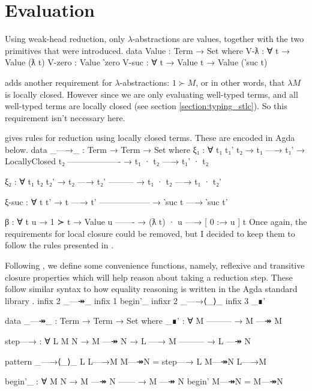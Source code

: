\documentclass[logo,bsc,singlespacing,parskip,online]{infthesis}
\renewenvironment{code}{\mintedcopy[breaklines,breaksymbolleft=\;]{agda}}{\endmintedcopy}
\begin{document}
\section{Evaluation}
Using weak-head reduction, only $\lambda$-abstractions are values, together with the two primitives
that were introduced.
\begin{code}
data Value : Term → Set where
  V-ƛ : ∀ {t} → Value (ƛ t)
  V-zero : Value ‵zero
  V-suc : ∀ {t} → Value t → Value (‵suc t)
\end{code}

\citet{chargueraud_locally_2012} adds another requirement for $\lambda$-abstractions: $1 \succ M$,
or in other words, that $\lambda M$ is locally closed. However since we are only evaluating
well-typed terms, and all well-typed terms are locally closed (see section
\ref{section:typing_stlc}). So this requirement isn't necessary here.

\citet{chargueraud_locally_2012} gives rules for reduction using locally closed terms. These are
encoded in Agda below.
\begin{code}
data _—→_ : Term → Term → Set where
  ξ₁ : ∀ {t₁ t₁' t₂}
    → t₁ —→ t₁'
    → LocallyClosed t₂
      -------------------
    → t₁ · t₂ —→ t₁' · t₂

  ξ₂ : ∀ {t₁ t₂ t₂'}
    → t₂ —→ t₂'
      ---------
    → t₁ · t₂ —→ t₁ · t₂'

  ξ-suc : ∀ {t t'}
    → t —→ t'
      ------------------
    → ‵suc t —→ ‵suc t'

  β : ∀ {t u}
    → 1 ≻ t
    → Value u
      -------
    → (ƛ t) · u —→ [ 0 :→ u ] t
\end{code}
Once again, the requirements for local closure could be removed, but I decided to keep them to
follow the rules presented in \citet{chargueraud_locally_2012}.

Following \citet{wadler_programming_2022}, we define some convenience functions, namely, reflexive
and transitive closure properties which will help reason about taking a reduction step. These follow
similar syntax to how equality reasoning is written in the Agda standard library
\citep{the_agda_community_agda_2024}.
\begin{code}
infix  2 _—↠_
infix  1 begin'_
infixr 2 _—→⟨_⟩_
infix  3 _∎'

data _—↠_ : Term → Term → Set where
  _∎' : ∀ M
      ---------
    → M —↠ M

  step—→ : ∀ L {M N}
    → M —↠ N
    → L —→ M
      ---------
    → L —↠ N

pattern _—→⟨_⟩_ L L—→M M—↠N = step—→ L M—↠N L—→M

begin'_ : ∀ {M N}
  → M —↠ N
    ------
  → M —↠ N
begin' M—↠N = M—↠N
\end{code}
\end{document}
